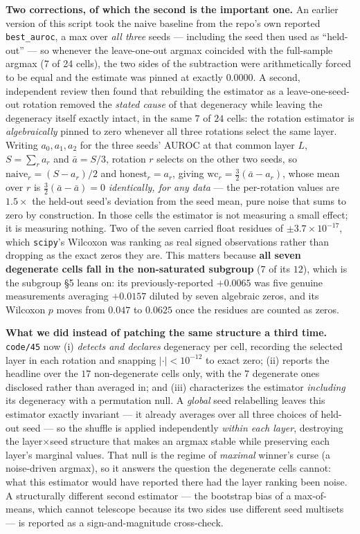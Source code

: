 \documentclass[10pt]{article} %
\begin{document}
\textbf{Two corrections, of which the second is the important one.} An
earlier version of this script took the naive baseline from the repo's own
reported \texttt{best\_auroc}, a max over \emph{all three} seeds --- including
the seed then used as ``held-out'' --- so whenever the leave-one-out argmax
coincided with the full-sample argmax (7 of 24 cells), the two sides of the
subtraction were arithmetically forced to be equal and the estimate was pinned
at exactly $0.0000$. A second, independent review then found that rebuilding
the estimator as a leave-one-seed-out rotation removed the \emph{stated cause}
of that degeneracy while leaving the degeneracy itself exactly intact, in the
same $7$ of $24$ cells: the rotation estimator is \emph{algebraically} pinned
to zero whenever all three rotations select the same layer. Writing
$a_0,a_1,a_2$ for the three seeds' AUROC at that common layer $L$,
$S=\sum_r a_r$ and $\bar a=S/3$, rotation $r$ selects on the other two seeds,
so $\text{naive}_r=(S-a_r)/2$ and $\text{honest}_r=a_r$, giving
$\text{wc}_r=\tfrac{3}{2}(\bar a - a_r)$, whose mean over $r$ is
$\tfrac{3}{2}(\bar a-\bar a)=0$ \emph{identically, for any data} --- the
per-rotation values are $1.5\times$ the held-out seed's deviation from the seed
mean, pure noise that sums to zero by construction. In those cells the
estimator is not measuring a small effect; it is measuring nothing. Two of the
seven carried float residues of $\pm3.7\times10^{-17}$, which \texttt{scipy}'s
Wilcoxon was ranking as real signed observations rather than dropping as the
exact zeros they are. This matters because \textbf{all seven degenerate cells
fall in the non-saturated subgroup} ($7$ of its $12$), which is the subgroup §5
leans on: its previously-reported $+0.0065$ was five genuine measurements
averaging $+0.0157$ diluted by seven algebraic zeros, and its Wilcoxon $p$
moves from $0.047$ to $0.0625$ once the residues are counted as zeros.

\textbf{What we did instead of patching the same structure a third time.}
\texttt{code/45} now (i) \emph{detects and declares} degeneracy per cell,
recording the selected layer in each rotation and snapping $|{\cdot}|<10^{-12}$
to exact zero; (ii) reports the headline over the $17$ non-degenerate cells
only, with the $7$ degenerate ones disclosed rather than averaged in; and
(iii) characterizes the estimator \emph{including} its degeneracy with a
permutation null. A \emph{global} seed relabelling leaves this estimator
exactly invariant --- it already averages over all three choices of held-out
seed --- so the shuffle is applied independently \emph{within each layer},
destroying the layer$\times$seed structure that makes an argmax stable while
preserving each layer's marginal values. That null is the regime of
\emph{maximal} winner's curse (a noise-driven argmax), so it answers the
question the degenerate cells cannot: what this estimator would have reported
there had the layer ranking been noise. A structurally different second
estimator --- the bootstrap bias of a max-of-means, which cannot telescope
because its two sides use different seed multisets --- is reported as a
sign-and-magnitude cross-check.
\end{document}
